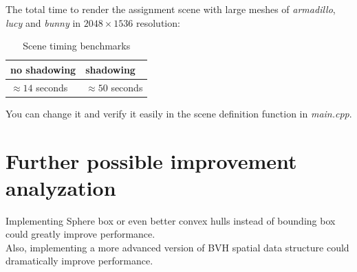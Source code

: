 \documentclass{article}
\begin{document}
The total time to render the assignment scene with large meshes of \textit{armadillo}, \textit{lucy} and \textit{bunny}
in $2048 \times 1536$ resolution:

\begin{table}[H]
  \caption{Scene timing benchmarks}
  \label{tab:scene-timing}
  \centering
  \begin{tabular}{|l|l|} \hline\hline
    no shadowing         & shadowing            \\ \hline
    $\approx 14$ seconds & $\approx 50$ seconds \\ \hline \hline
  \end{tabular}
  \label{table:rec_p16}
\end{table}

You can change it and verify it easily in the scene definition function in \textit{main.cpp}.

\section*{Further possible improvement analyzation}

Implementing Sphere box or even better convex hulls instead of bounding box could greatly improve performance.\\
Also, implementing a more advanced version of BVH spatial data structure could dramatically improve performance.\\
\end{document}
